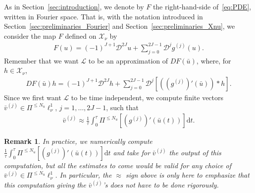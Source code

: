 \documentclass[10pt,a4paper]{article}
\theoremstyle{plain}
\newtheorem{remark}[theorem]{Remark}
\renewcommand{\L}{\mathcal{L}}
\newcommand{\D}{\mathcal{D}}
\newcommand{\X}{\mathcal{X}}
\newcommand{\bu}{\bar{u}}
\newcommand{\bv}{\bar{v}}
\newcommand{\1}{\mathbf{1}}
\renewcommand{\d}{\mathrm{d}}
\newcommand{\Nu}{N_{u}}
\begin{document}
As in Section~\ref{sec:introduction}, we denote by $F$ the right-hand-side of~\eqref{eq:PDE}, written in Fourier space. That is, with the notation introduced in Section~\ref{sec:preliminaries_Fourier} and Section~\ref{sec:preliminaries_Xnu}, we consider the map $F$ defined on $\X_\nu$ by
\begin{align*}
F(u) = (-1)^{J+1} \D^{2J}u + \displaystyle\sum_{j=0}^{2J-1} \D^{j}g^{(j)}(u).
\end{align*}
Remember that we want $\L$ to be an approximation of $DF(\bu)$, where, for $h\in\X_\nu$,
\begin{align*}
DF(\bu)h = (-1)^{J+1} \D^{2J}h + \displaystyle\sum_{j=0}^{2J-1} \D^{j}\left[\left( \left(g^{(j)}\right)' (\bu)\right)\ast h\right].
\end{align*}
Since we first want $\L$ to be time independent, we compute finite vectors $\bv^{(j)} \in\Pi^{\leq \Nu}\ell^1_\nu$, $j=1,\ldots,2J-1$, such that
\begin{align*}
\bv^{(j)} \approx \frac{1}{\tau}\int_{0}^{\tau} \Pi^{\leq \Nu}\left[\left(g^{(j)}\right)'(\bu(t))\right] \d t.
\end{align*}
%
\begin{remark}
In practice, we numerically compute $\frac{1}{\tau}\int_{0}^{\tau} \Pi^{\leq \Nu}\left[\left(g^{(j)}\right)'(\bu(t))\right] \d t$ and take for $\bv^{(j)}$ the output of this computation, but all the estimates to come would be valid for any choice of $\bv^{(j)} \in\Pi^{\leq \Nu}\ell^1_\nu$. In particular, the $\approx$ sign above is only here to emphasize that this computation giving the $\bv^{(j)}$'s does not have to be done rigorously. 
\end{remark}
\end{document}
